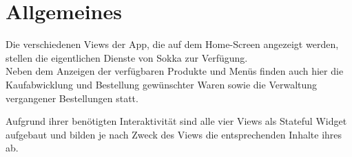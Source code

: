 \section{Allgemeines}

Die verschiedenen Views der App, die auf dem Home-Screen angezeigt werden, stellen die eigentlichen
Dienste von Sokka zur Verfügung.\\
Neben dem Anzeigen der verfügbaren Produkte und Menüs finden auch hier die Kaufabwicklung und
Bestellung gewünschter Waren sowie die Verwaltung vergangener Bestellungen statt.

Aufgrund ihrer benötigten Interaktivität sind alle vier Views als Stateful Widget aufgebaut und
bilden je nach Zweck des Views die entsprechenden Inhalte ihres  ab.

